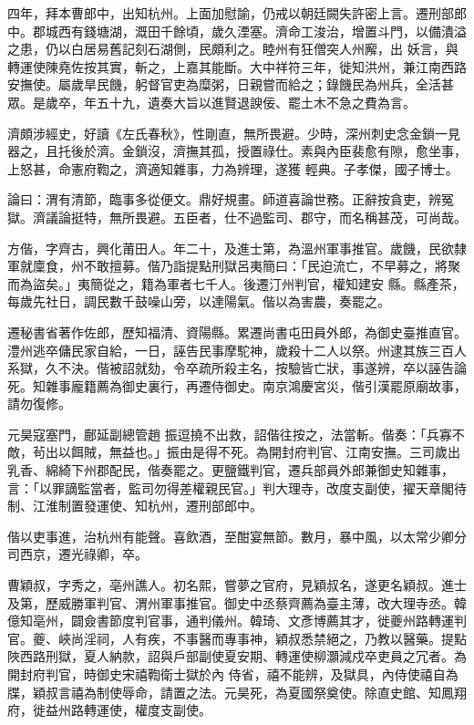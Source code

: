 \begin{pinyinscope}
 四年，拜本曹郎中，出知杭州。上面加慰諭，仍戒以朝廷闕失許密上言。遷刑部郎中。郡城西有錢塘湖，溉田千餘頃，歲久湮塞。濟命工浚治，增置斗門，以備潰溢之患，仍以白居易舊記刻石湖側，民頗利之。睦州有狂僧突人州廨，出
 妖言，與轉運使陳堯佐按其實，斬之，上嘉其能斷。大中祥符三年，徙知洪州，兼江南西路安撫使。屬歲旱民饑，躬督官吏為糜粥，日親嘗而給之；錄饑民為州兵，全活甚眾。是歲卒，年五十九，遺奏大旨以進賢退諛佞、罷土木不急之費為言。



 濟頗涉經史，好讀《左氏春秋》，性剛直，無所畏避。少時，深州刺史念金鎖一見器之，且托後於濟。金鎖沒，濟撫其孤，授置祿仕。素與內臣裴愈有隙，愈坐事，上怒甚，命憲府鞫之，濟適知雜事，力為辨理，遂獲
 輕典。子孝傑，國子博士。



 論曰：渭有清節，臨事多從便文。鼎好規畫。師道喜論世務。正辭按貪吏，辨冤獄。濟議論挺特，無所畏避。五臣者，仕不過監司、郡守，而名稱甚茂，可尚哉。



 方偕，字齊古，興化莆田人。年二十，及進士第，為溫州軍事推官。歲饑，民欲隸軍就廩食，州不敢擅募。偕乃詣提點刑獄呂夷簡曰：「民迫流亡，不早募之，將聚而為盜矣。」夷簡從之，籍為軍者七千人。後遷汀州判官，權知建安
 縣。縣產茶，每歲先社日，調民數千鼓噪山旁，以達陽氣。偕以為害農，奏罷之。



 遷秘書省著作佐郎，歷知福清、資陽縣。累遷尚書屯田員外郎，為御史臺推直官。澧州逃卒傭民家自給，一日，誣告民事摩駝神，歲殺十二人以祭。州逮其族三百人系獄，久不決。偕被詔就劾，令卒疏所殺主名，按驗皆亡狀，事遂辨，卒以誣告論死。知雜事龐籍薦為御史裏行，再遷侍御史。南京鴻慶宮災，偕引漢罷原廟故事，請勿復修。



 元昊寇塞門，鄜延副總管趙
 振逗撓不出救，詔偕往按之，法當斬。偕奏：「兵寡不敵，茍出以餌賊，無益也。」振由是得不死。為開封府判官、江南安撫。三司歲出乳香、綿綺下州郡配民，偕奏罷之。更鹽鐵判官，遷兵部員外郎兼御史知雜事，言：「以罪謫監當者，監司勿得差權親民官。」判大理寺，改度支副使，擢天章閣待制、江淮制置發運使、知杭州，遷刑部郎中。



 偕以吏事進，治杭州有能聲。喜飲酒，至酣宴無節。數月，暴中風，以太常少卿分司西京，遷光祿卿，卒。



 曹穎叔，字秀之，亳州譙人。初名熙，嘗夢之官府，見穎叔名，遂更名穎叔。進士及第，歷威勝軍判官、渭州軍事推官。御史中丞蔡齊薦為臺主薄，改大理寺丞。韓億知亳州，闢僉書節度判官事，通判儀州。韓琦、文彥博薦其才，徙夔州路轉運判官。夔、峽尚淫祠，人有疾，不事醫而專事神，穎叔悉禁絕之，乃教以醫藥。提點陜西路刑獄，夏人納款，詔與戶部副使夏安期、轉運使柳灝減戍卒吏員之冗者。為開封府判官，時御史宋禧鞫衛士獄於內
 侍省，禧不能辨，及獄具，內侍使禧自為牒，穎叔言禧為制使辱命，請置之法。元昊死，為夏國祭奠使。除直史館、知鳳翔府，徙益州路轉運使，權度支副使。




\end{pinyinscope}

